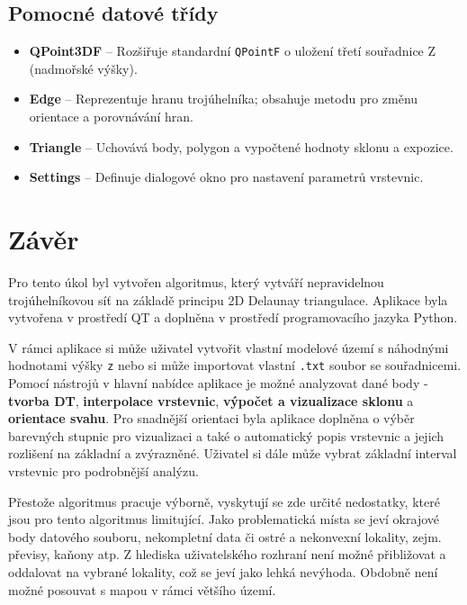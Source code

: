\documentclass[12pt, a4paper]{article}
\begin{document}
\subsection{Pomocné datové třídy}
\begin{itemize}
    \item \textbf{QPoint3DF} – Rozšiřuje standardní \texttt{QPointF} o uložení třetí souřadnice Z (nadmořské výšky).
    \item \textbf{Edge} – Reprezentuje hranu trojúhelníka; obsahuje metodu pro změnu orientace a porovnávání hran.
    \item \textbf{Triangle} –  Uchovává body, polygon a vypočtené hodnoty sklonu a expozice.
    \item \textbf{Settings} – Definuje dialogové okno pro nastavení parametrů vrstevnic.
\end{itemize}

\section{Závěr}
Pro tento úkol byl vytvořen algoritmus, který vytváří nepravidelnou trojúhelníkovou síť na základě principu 2D Delaunay triangulace. Aplikace byla vytvořena v prostředí QT a doplněna v prostředí programovacího jazyka Python. 

V rámci aplikace si může uživatel vytvořit vlastní modelové území s náhodnými hodnotami výšky \texttt{z} nebo si může importovat vlastní \texttt{.txt} soubor se souřadnicemi. Pomocí nástrojů v hlavní nabídce aplikace je možné analyzovat dané body - \textbf{tvorba DT}, \textbf{interpolace vrstevnic}, \textbf{výpočet a vizualizace sklonu} a \textbf{orientace svahu}. Pro snadnější orientaci byla aplikace doplněna o výběr barevných stupnic pro vizualizaci a také o automatický popis vrstevnic a jejich rozlišení na základní a zvýrazněné. Uživatel si dále může vybrat základní interval vrstevnic pro podrobnější analýzu.

Přestože algoritmus pracuje výborně, vyskytují se zde určité nedostatky, které jsou pro tento algoritmus limitující. Jako problematická místa se jeví okrajové body datového souboru, nekompletní data či ostré a nekonvexní lokality, zejm. převisy, kaňony atp. Z hlediska uživatelského rozhraní není možné přibližovat a oddalovat na vybrané lokality, což se jeví jako lehká nevýhoda. Obdobně není možné posouvat s mapou v rámci většího území.

\printbibliography[title=Zdroje]
\end{document}
